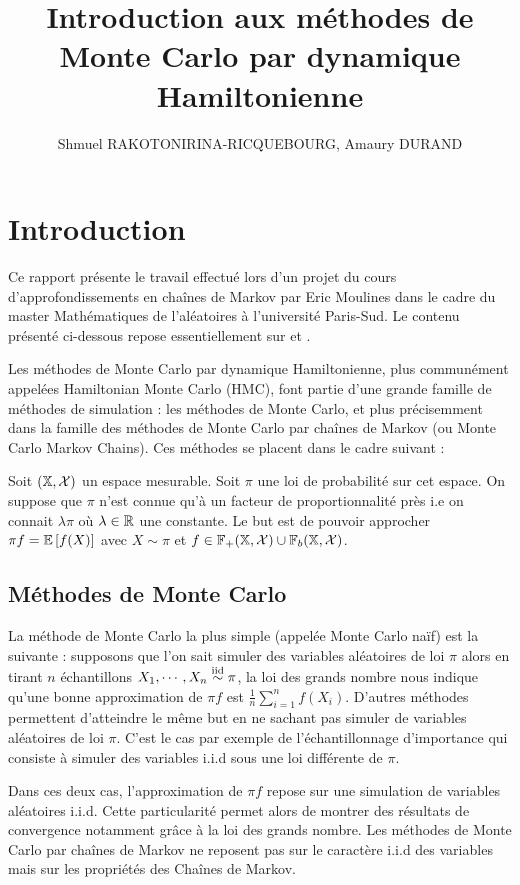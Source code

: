 \documentclass[10pt,a4paper]{article}
\title{Introduction aux méthodes de Monte Carlo par dynamique Hamiltonienne}
\author{Shmuel RAKOTONIRINA-RICQUEBOURG, Amaury DURAND}
\begin{document}
\maketitle
\tableofcontents
\section{Introduction}
Ce rapport présente le travail effectué lors d'un projet du cours d'approfondissements en chaînes de Markov par Eric Moulines dans le cadre du master Mathématiques de l'aléatoires à l'université Paris-Sud. Le contenu présenté ci-dessous repose essentiellement sur \cite{Neal-hmc} et \cite{Douc-mc}. 

Les méthodes de Monte Carlo par dynamique Hamiltonienne, plus communément appelées Hamiltonian Monte Carlo (HMC), font partie d'une grande famille de méthodes de simulation : les méthodes de Monte Carlo, et plus précisemment dans la famille des méthodes de Monte Carlo par chaînes de Markov (ou Monte Carlo Markov Chains). Ces méthodes se placent dans le cadre suivant :
\begin{Def}
  Soit $(\mathbb{X}, \mathcal{X})$ un espace mesurable. Soit $\pi$ une loi de probabilité sur cet espace. On suppose que $\pi$ n'est connue qu'à un facteur de proportionnalité près i.e on connait $\lambda \pi$ où $\lambda \in \mathbb{R}$ une constante. Le but est de pouvoir approcher $\pi f = \EE[f(X)]$ avec $X \sim \pi$ et $f \in \mathbb{F}_+(\mathbb{X}, \mathcal{X}) \cup \mathbb{F}_b(\mathbb{X}, \mathcal{X})$.
\end{Def}

\subsection{Méthodes de Monte Carlo}

La méthode de Monte Carlo la plus simple (appelée Monte Carlo naïf) est la suivante : supposons que l'on sait simuler des variables aléatoires de loi $\pi$ alors en tirant $n$ échantillons $X_1, \cdots, X_n \stackrel{\rm iid}{\sim} \pi$, la loi des grands nombre nous indique qu'une bonne approximation de $\pi f$ est $\frac{1}{n} \sum_{i=1}^n f(X_i)$. D'autres méthodes permettent d'atteindre le même but en ne sachant pas simuler de variables aléatoires de loi $\pi$. C'est le cas par exemple de l'échantillonnage d'importance qui consiste à simuler des variables i.i.d sous une loi différente de $\pi$.

Dans ces deux cas, l'approximation de $\pi f$ repose sur une simulation de variables aléatoires i.i.d. Cette particularité permet alors de montrer des résultats de convergence notamment grâce à la loi des grands nombre. Les méthodes de Monte Carlo par chaînes de Markov ne reposent pas sur le caractère i.i.d des variables mais sur les propriétés des Chaînes de Markov. 
\end{document}
